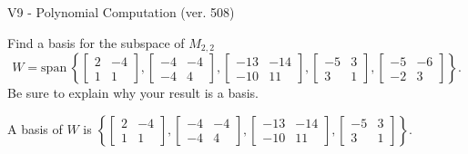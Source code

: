 \begin{exercise}
  \begin{exerciseTitle}V9 - Polynomial Computation (ver. 508)\end{exerciseTitle}
  \begin{exerciseStatement}
    Find a basis for the subspace of \(M_{2,2}\) 
\[W=\mathrm{span}\ \left\{\left[\begin{array}{cc}
2 & -4 \\
1 & 1
\end{array}\right] , \left[\begin{array}{cc}
-4 & -4 \\
-4 & 4
\end{array}\right] , \left[\begin{array}{cc}
-13 & -14 \\
-10 & 11
\end{array}\right] , \left[\begin{array}{cc}
-5 & 3 \\
3 & 1
\end{array}\right] , \left[\begin{array}{cc}
-5 & -6 \\
-2 & 3
\end{array}\right]\right\}.\]
 Be sure to explain why your result is a basis.


  \end{exerciseStatement}
  \begin{exerciseAnswer}
   A basis of \(W\) is  \(\left\{\left[\begin{array}{cc}
2 & -4 \\
1 & 1
\end{array}\right] , \left[\begin{array}{cc}
-4 & -4 \\
-4 & 4
\end{array}\right] , \left[\begin{array}{cc}
-13 & -14 \\
-10 & 11
\end{array}\right] , \left[\begin{array}{cc}
-5 & 3 \\
3 & 1
\end{array}\right]\right\}\).
  


  \end{exerciseAnswer}
\end{exercise}